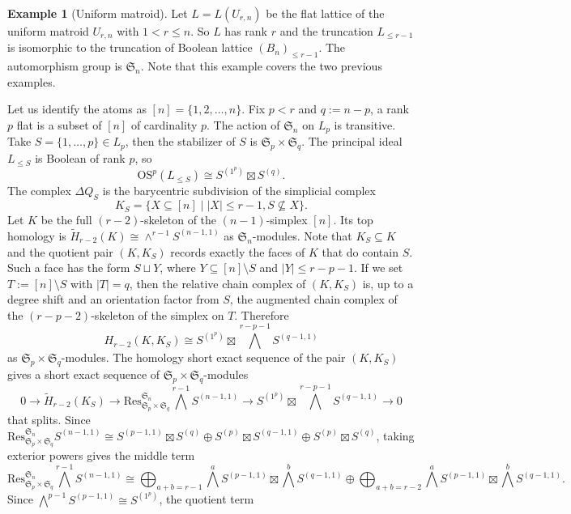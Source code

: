 \documentclass{amsart}
\numberwithin{equation}{section}
\theoremstyle{plain}
\theoremstyle{remark}
\theoremstyle{definition}
\newtheorem{ex}[thm]{Example}
\numberwithin{equation}{section}
\newcommand{\OS}{\mathrm{OS}}
\begin{document}
\begin{ex}[Uniform matroid] Let $L=L(U_{r,n})$ be the flat lattice of the uniform matroid $U_{r,n}$ with $1<r\leq n$. So $L$ has rank $r$ and the truncation $L_{\leq r-1}$ is isomorphic to the truncation of Boolean lattice $(B_n)_{\leq r-1}$. The automorphism group is $\mathfrak{S}_n$. Note that this example covers the two previous examples.

Let us identify the atoms as $[n]=\{1,2,\ldots,n\}$. Fix $p<r$ and $q:=n-p$, a rank $p$ flat is a subset of $[n]$ of cardinality $p$. The action of $\mathfrak{S}_n$ on $L_p$ is transitive. Take $S=\{1,\ldots,p\}\in L_p$, then the stabilizer of $S$ is $\mathfrak{S}_p\times\mathfrak{S}_q$. The principal ideal $L_{\leq S}$ is Boolean of rank $p$, so
\[
\OS^p(L_{\leq S})\cong S^{(1^p)}\boxtimes S^{(q)}.
\]
The complex $\Delta Q_S$ is the barycentric subdivision of the simplicial complex
\[
K_S=\{X\subseteq [n]\mid |X|\leq r-1,S\not\subseteq X\}.
\]
Let $K$ be the full $(r-2)$-skeleton of the $(n-1)$-simplex $[n]$. Its top homology is $\widetilde{H}_{r-2}(K)\cong \wedge^{r-1}S^{(n-1,1)}$ as $\mathfrak{S}_n$-modules. Note that $K_S\subseteq K$ and the quotient pair $(K,K_S)$ records exactly the faces of $K$ that do contain $S$. Such a face has the form $S\sqcup Y$, where $Y\subseteq [n]\setminus S$ and $|Y|\leq r-p-1$. If we set $T:=[n]\setminus S$ with $|T|=q$, then the relative chain complex of $(K,K_S)$ is, up to a degree shift and an orientation factor from $S$, the augmented chain complex of the $(r-p-2)$-skeleton of the simplex on $T$. Therefore
\[
H_{r-2}(K,K_S)\cong S^{(1^p)}\boxtimes \bigwedge^{r-p-1}S^{(q-1,1)}
\]
as $\mathfrak{S}_p\times\mathfrak{S}_q$-modules. The homology short exact sequence of the pair $(K,K_S)$ gives a short exact sequence of $\mathfrak{S}_p\times\mathfrak{S}_q$-modules
\[
0\to \widetilde{H}_{r-2}(K_S)\to \mathrm{Res}^{\mathfrak{S}_n}_{\mathfrak{S}_p\times\mathfrak{S}_q}\bigwedge^{r-1}S^{(n-1,1)}\to S^{(1^p)}\boxtimes \bigwedge^{r-p-1}S^{(q-1,1)}\to 0
\]
that splits. Since $\mathrm{Res}^{\mathfrak{S}_n}_{\mathfrak{S}_p\times\mathfrak{S}_q}S^{(n-1,1)}\cong S^{(p-1,1)}\boxtimes S^{(q)}\oplus S^{(p)}\boxtimes S^{(q-1,1)}\oplus S^{(p)}\boxtimes S^{(q)}$, taking exterior powers gives the middle term
\[
\mathrm{Res}^{\mathfrak{S}_n}_{\mathfrak{S}_p\times\mathfrak{S}_q}\bigwedge^{r-1}S^{(n-1,1)}\cong \bigoplus_{a+b=r-1}\bigwedge^a S^{(p-1,1)}\boxtimes\bigwedge^b S^{(q-1,1)}\oplus \bigoplus_{a+b=r-2}\bigwedge^a S^{(p-1,1)}\boxtimes\bigwedge^b S^{(q-1,1)}.
\]
Since $\bigwedge^{p-1}S^{(p-1,1)}\cong S^{(1^p)}$, the quotient term

\end{ex}
\end{document}
